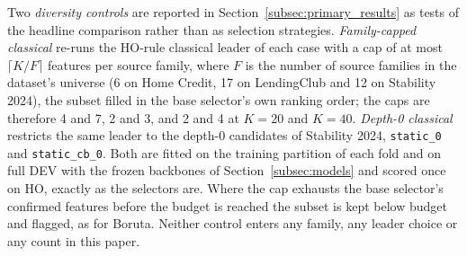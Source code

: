 \documentclass[final,5p,twocolumn]{elsarticle}
\newcommand{\Kfeat}{K}
\begin{document}
Two \emph{diversity controls} are reported in Section~\ref{subsec:primary_results} as tests of the headline comparison rather than as selection strategies. \emph{Family-capped classical} re-runs the HO-rule classical leader of each case with a cap of at most $\lceil \Kfeat/F\rceil$ features per source family, where $F$ is the number of source families in the dataset's universe (6 on Home Credit, 17 on LendingClub and 12 on Stability 2024), the subset filled in the base selector's own ranking order; the caps are therefore 4 and 7, 2 and 3, and 2 and 4 at $\Kfeat=20$ and $\Kfeat=40$. \emph{Depth-0 classical} restricts the same leader to the depth-0 candidates of Stability 2024, \texttt{static\_0} and \texttt{static\_cb\_0}. Both are fitted on the training partition of each fold and on full DEV with the frozen backbones of Section~\ref{subsec:models} and scored once on HO, exactly as the selectors are. Where the cap exhausts the base selector's confirmed features before the budget is reached the subset is kept below budget and flagged, as for Boruta. Neither control enters any family, any leader choice or any count in this paper.
\end{document}
